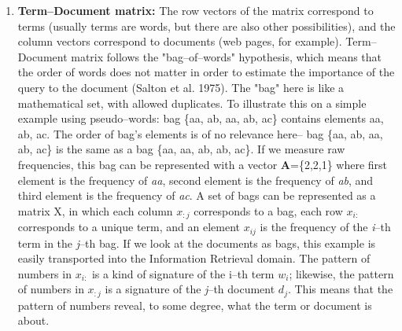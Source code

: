 \begin{enumerate}
\item \textbf{Term--Document matrix:} The row vectors of the matrix correspond to terms (usually 
terms are words, but there are also other possibilities), and the column vectors correspond to 
documents (web pages, for example).  Term--Document matrix follows the "bag--of--words" hypothesis, 
which means that the order of words does not matter in order to estimate the importance of the query 
to the document (Salton et al. 1975). The "bag" here is like a mathematical set, with 
allowed duplicates.  To illustrate this on a simple example using pseudo--words: bag \{aa, ab, aa, ab, 
ac\} contains elements aa, ab, ac. The order of bag's elements is of no relevance here-- bag \{aa, ab, 
aa, ab, ac\} is the same as a bag \{aa, aa, ab, ab, ac\}. If we measure raw frequencies, this bag can 
be represented with a vector \textbf{A}=\{2,2,1\} where first element is the frequency of \textit{aa}, 
second element is the frequency of \textit{ab}, and third element is the frequency of \textit{ac}. A set of 
bags can be represented as a matrix X, in which each column $x_{:j}$ corresponds to a bag, each row 
$x_{i:}$ corresponds to a unique term, and an element $x_{ij}$ is the frequency of the \textit{i}--th 
term in the \textit{j}--th bag. If we look at the documents as bags, this example is easily transported into the 
Information Retrieval domain. The pattern of numbers in $x_{i:}$ is a kind of signature of the i--th term 
$w_{i}$; likewise, the pattern of numbers in $x_{:j}$ is a signature of the \textit{j}--th document 
$d_{j}$. This means that the pattern of numbers reveal, to some degree, what the term or document is 
about.


\end{enumerate}
